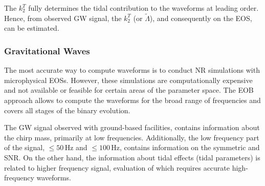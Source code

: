 %
The $k_2^T$ fully determines the tidal contribution to the waveforms at leading order. 
Hence, from observed \ac{GW} signal, the $k_2^T$ (or $\tilde{\Lambda}$), and 
consequently on the \ac{EOS}, can be estimated. 
%

\subsubsection{Gravitational Waves}

The most accurate way to compute waveforms is to conduct \ac{NR} simulations with microphysical 
\acp{EOS}. However, these simulations are computationally expensive and not available or feasible 
for certain areas of the parameter space. The \ac{EOB} approach allows to compute the waveforms 
for the broad range of frequencies and covers all stages of the binary evolution. 

The \ac{GW} signal observed with ground-based facilities, contains information 
about the chirp mass, 
primarily at low frequencies. Additionally, the low frequency part of the signal, 
${\leq}50\,$Hz and ${\leq}100\,$Hz, contains information on the symmetric \mr{} and \ac{SNR}.
On the other hand, the information about tidal effects (tidal parameters) is related to 
higher frequency signal, evaluation of which requires accurate high-frequency waveforms.


